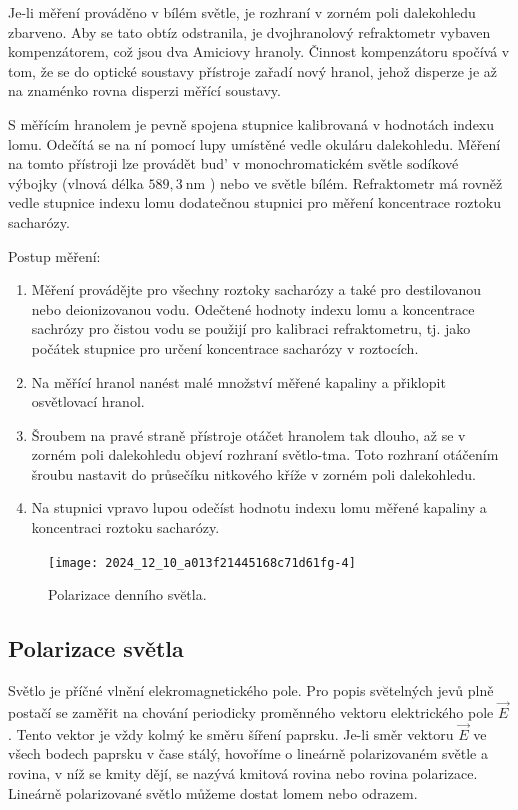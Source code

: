 \documentclass[czech,11pt,a4paper]{article}
\begin{document}
\begin{multicols}{2}
	Je-li měření prováděno v bílém světle, je rozhraní v zorném poli dalekohledu zbarveno. Aby se tato obtíz odstranila, je dvojhranolový refraktometr vybaven kompenzátorem, což jsou dva Amiciovy hranoly. Činnost kompenzátoru spočívá v tom, že se do optické soustavy přístroje zařadí nový hranol, jehož disperze je až na znaménko rovna disperzi měřící soustavy.
	
	S měřícím hranolem je pevně spojena stupnice kalibrovaná v hodnotách indexu lomu. Odečítá se na ní pomocí lupy umístěné vedle okuláru dalekohledu. Měření na tomto přístroji lze provádět bud' v monochromatickém světle sodíkové výbojky (vlnová délka $589,3 \mathrm{~nm}$ ) nebo ve světle bílém. Refraktometr má rovněž vedle stupnice indexu lomu dodatečnou stupnici pro měření koncentrace roztoku sacharózy.
	
	Postup měření:
	
	\begin{enumerate}
		\item Měření provádějte pro všechny roztoky sacharózy a také pro destilovanou nebo deionizovanou vodu. Odečtené hodnoty indexu lomu a koncentrace sachrózy pro čistou vodu se použijí pro kalibraci refraktometru, tj. jako počátek stupnice pro určení koncentrace sacharózy v roztocích.
		\item Na měřící hranol nanést malé množství měřené kapaliny a přiklopit osvětlovací hranol.
		\item Šroubem na pravé straně přístroje otáčet hranolem tak dlouho, až se v zorném poli dalekohledu objeví rozhraní světlo-tma. Toto rozhraní otáčením šroubu nastavit do průsečíku nitkového kříže v zorném poli dalekohledu.
		\item Na stupnici vpravo lupou odečíst hodnotu indexu lomu měřené kapaliny a koncentraci roztoku sacharózy.\\
	
	\end{enumerate}
	\begin{figure}[H]
			\texttt{[image: 2024\_12\_10\_a013f21445168c71d61fg-4]}
			\caption{Polarizace denního svĕtla.}
	\end{figure}
	
	\subsection*{Polarizace světla}
	Světlo je příčné vlnění elekromagnetického pole. Pro popis svĕtelných jevů plně postačí se zaměřit na chování periodicky proměnného vektoru elektrického pole $\vec{E}$. Tento vektor je vždy kolmý ke směru šíření paprsku. Je-li směr vektoru $\vec{E}$ ve všech bodech paprsku v čase stálý, hovoříme o lineárně polarizovaném světle a rovina, v níž se kmity dějí, se nazývá kmitová rovina nebo rovina polarizace. Lineárně polarizované světlo můžeme dostat lomem nebo odrazem.
	

\end{multicols}
\end{document}
